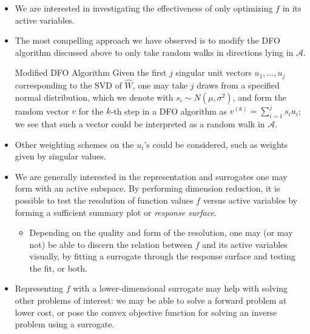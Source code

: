 \documentclass[11pt]{beamer}
\newcommand{\A}{\mathcal{A}}
\begin{document}
\begin{frame}

\begin{itemize}
	\item We are interested in investigating the effectiveness of only optimizing $f$ in its active variables.
	
	\item The most compelling approach we have observed is to modify the DFO algorithm discussed above to only take random walks in directions lying in $\A$.
	
	
	
	\begin{block}{Modified DFO Algorithm}
	Given the first $j$ singular unit vectors $u_1,\ldots,u_j$ corresponding to the SVD of $\hat{W}$, one may take $j$ draws from a specified normal distribution, which we denote with $s_i\sim N(\mu,\sigma^2)$, and form the random vector $v$ for the $k$-th step in a DFO algorithm as $v^{(k)}=\sum_{i=1}^js_iu_i$; we see that such a vector could be interpreted as a random walk in $\A$.
	
	\end{block}
	
	
	\item Other weighting schemes on the $u_i$'s could be considered, such as weights given by singular values.
	

	
\end{itemize}

\end{frame}


\begin{frame}

\begin{itemize}

	\item We are generally interested in the representation and surrogates one may form with an active subspace. By performing dimension reduction, it is possible to test the resolution of function values $f$ versus active variables by forming a sufficient summary plot or \emph{response surface}. 
	
\begin{itemize}


	\item Depending on the quality and form of the resolution, one may (or may not) be able to discern the relation between $f$ and its active variables visually, by fitting a surrogate through the response surface and testing the fit, or both. 

\end{itemize}	
	
	\item Representing $f$ with a lower-dimensional surrogate may help with solving other problems of interest: we may be able to solve a forward problem at lower cost, or pose the convex objective function for solving an inverse problem using a surrogate.
	
\end{itemize}


\end{frame}
\end{document}
